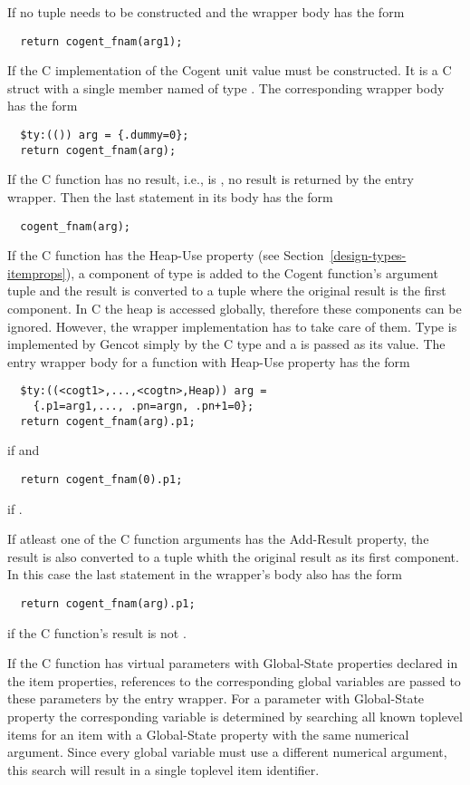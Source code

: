 If  no tuple needs to be constructed and the wrapper body has the form
\begin{verbatim}
  return cogent_fnam(arg1);
\end{verbatim}

If  the C implementation of the Cogent unit value must be constructed. It is a C struct with 
a single member named  of type . The corresponding wrapper body has the form
\begin{verbatim}
  $ty:(()) arg = {.dummy=0};
  return cogent_fnam(arg);
\end{verbatim}

If the C function has no result, i.e.,  is , no result is returned by the entry
wrapper. Then the last statement in its body has the form
\begin{verbatim}
  cogent_fnam(arg);
\end{verbatim}

If the C function has the Heap-Use property (see Section~\ref{design-types-itemprops}), a component of type
 is added to the Cogent function's argument tuple and the result is converted to a tuple where the
original result is the first component. In C the heap is accessed globally, therefore these components can 
be ignored. However, the wrapper implementation has to take care of them. Type  is implemented by
Gencot simply by the C type  and a  is passed as its value. The entry wrapper body for a
function with Heap-Use property has the form
\begin{verbatim}
  $ty:((<cogt1>,...,<cogtn>,Heap)) arg = 
    {.p1=arg1,..., .pn=argn, .pn+1=0};
  return cogent_fnam(arg).p1;
\end{verbatim}
if  and
\begin{verbatim}
  return cogent_fnam(0).p1;
\end{verbatim}
if .

If atleast one of the C function arguments has the Add-Result property, the result is also converted to a tuple 
whith the original result as its first component. In this case the last statement in the wrapper's body also 
has the form
\begin{verbatim}
  return cogent_fnam(arg).p1;
\end{verbatim}
if the C function's result is not .

If the C function has virtual parameters with Global-State properties declared in the item properties, references
to the corresponding global variables are passed to these parameters by the entry wrapper. For a parameter with 
Global-State property the corresponding variable is determined by searching all known toplevel items for an
item with a Global-State property with the same numerical argument. Since every global variable must use a 
different numerical argument, this search will result in a single toplevel item identifier. 

